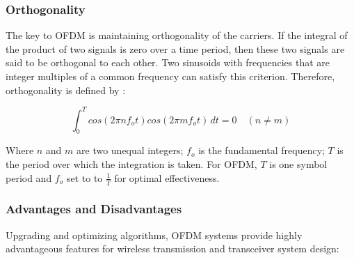 \subsubsection{Orthogonality}

The key to OFDM is maintaining orthogonality of the carriers. If the integral of the product of two signals is zero over a time period, then these two signals are said to be orthogonal to each other. Two sinusoids with frequencies that are integer multiples of a common frequency can satisfy this criterion. Therefore, orthogonality is defined by :

\begin{equation}\label{eq1}
    \int_{0}^{T} cos(2 \pi n f_o t) cos(2 \pi m f_o t) \,dt = 0 \quad (n \neq m)
\end{equation}

Where $n$ and $m$ are two unequal integers; $f_o$ is the fundamental frequency; $T$ is the period over which the integration is taken. For OFDM, $T$ is one symbol period and $f_o$ set to to $\frac{1}{T}$ for optimal effectiveness.

\subsubsection{Advantages and Disadvantages}

Upgrading and optimizing algorithms, OFDM systems provide highly advantageous features for wireless transmission and transceiver system design:

